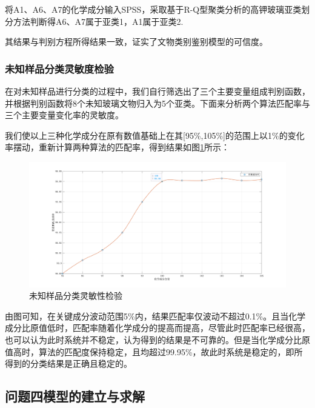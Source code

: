 \documentclass{my_paper}
\begin{document}
将A1、A6、A7的化学成分输入SPSS，采取基于R-Q型聚类分析的高钾玻璃亚类划分方法判断得A6、A7属于亚类1，A1属于亚类2.

其结果与判别方程所得结果一致，证实了文物类别鉴别模型的可信度。

\subsubsection{未知样品分类灵敏度检验}
在对未知样品进行分类的过程中，我们自行筛选出了三个主要变量组成判别函数，并根据判别函数将8个未知玻璃文物归入为5个亚类。下面来分析两个算法匹配率与三个主要变量变化率的灵敏度。\par
我们使以上三种化学成分在原有数值基础上在其[95\%,105\%]的范围上以1\%的变化率摆动，重新计算两种算法的匹配率，得到结果如图\ref{第三问灵敏度分析}所示：
\begin{figure}[H]
    \centering
    \includegraphics[width=1.0\textwidth]{第三问灵敏度分析.jpg}
    \caption{未知样品分类灵敏性检验}
    \label{第三问灵敏度分析}
\end{figure}

由图可知，在关键成分波动范围5\%内，结果匹配率仅波动不超过0.1\%。且当化学成分比原值低时，匹配率随着化学成分的提高而提高，尽管此时匹配率已经很高，也可以认为此时系统并不稳定，认为得到的结果是不可靠的。但是当化学成分比原值高时，算法的匹配度保持稳定，且均超过99.95\%，故此时系统是稳定的，即所得到的分类结果是正确且稳定的。
\newpage
\subsection{问题四模型的建立与求解}
\end{document}
